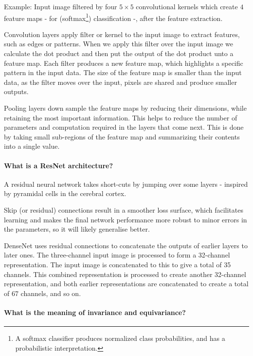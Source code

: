 Example: Input image filtered by four $5 \times 5$ convolutional kernels
which create $4$ feature maps - for (softmax\footnote{
A softmax classifier produces normalized class probabilities, and
has a probabilistic interpretation.}) classification -,
after the feature extraction.

Convolution layers apply filter or kernel to the input image to extract features, such as edges or
patterns. When we apply this filter over the input image we calculate the dot product and then put the
output of the dot product unto a feature map. Each filter produces a new feature map, which
highlights a specific pattern in the input data. The size of the feature map is smaller than the input
data, as the filter moves over the input, pixels are shared and produce smaller outputs.

Pooling layers down sample the feature maps by reducing their dimensions, while retaining the most
important information. This helps to reduce the number of parameters and computation required in
the layers that come next. This is done by taking small sub-regions of the feature map and
summarizing their contents into a single value.

\paragraph{What is a ResNet architecture?}

A residual neural network takes short-cuts by jumping over some layers -
inspired by pyramidal cells in the cerebral cortex.

Skip (or residual) connections result in a smoother loss surface, which facilitates learning and
makes the final network performance more robust to minor errors in the parameters,
so it will likely generalise better.

DenseNet uses residual connections to concatenate the outputs of earlier layers to later ones.
The three-channel input image is processed to form a 32-channel representation.
The input image is concatenated to this to give a total of 35 channels.
This combined representation is processed to create another 32-channel representation,
and both earlier representations are concatenated to create a total of 67 channels, and so on.

\paragraph{What is the meaning of invariance and equivariance?}

